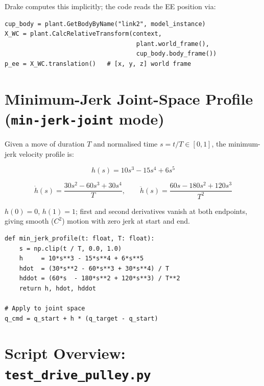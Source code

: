 \documentclass[11pt, a4paper]{article}
\begin{document}
\noindent Drake computes this implicitly; the code reads the EE position via:

\begin{lstlisting}
cup_body = plant.GetBodyByName("link2", model_instance)
X_WC = plant.CalcRelativeTransform(context,
                                    plant.world_frame(),
                                    cup_body.body_frame())
p_ee = X_WC.translation()   # [x, y, z] world frame
\end{lstlisting}

\section{Minimum-Jerk Joint-Space Profile (\texttt{min-jerk-joint} mode)}

Given a move of duration $T$ and normalised time $s = t/T \in [0,1]$,
the minimum-jerk velocity profile is:

\begin{equation}
  h(s) = 10s^3 - 15s^4 + 6s^5
  \label{eq:minjerk-pos}
\end{equation}

\begin{equation}
  \dot{h}(s) = \frac{30s^2 - 60s^3 + 30s^4}{T}, \qquad
  \ddot{h}(s) = \frac{60s - 180s^2 + 120s^3}{T^2}
  \label{eq:minjerk-vel}
\end{equation}

$h(0)=0$, $h(1)=1$; first and second derivatives vanish at both endpoints,
giving smooth ($C^2$) motion with zero jerk at start and end.

\begin{lstlisting}
def min_jerk_profile(t: float, T: float):
    s = np.clip(t / T, 0.0, 1.0)
    h     = 10*s**3 - 15*s**4 + 6*s**5
    hdot  = (30*s**2 - 60*s**3 + 30*s**4) / T
    hddot = (60*s  - 180*s**2 + 120*s**3) / T**2
    return h, hdot, hddot

# Apply to joint space
q_cmd = q_start + h * (q_target - q_start)
\end{lstlisting}

\section{Script Overview: \texttt{test\_drive\_pulley.py}}
\end{document}
